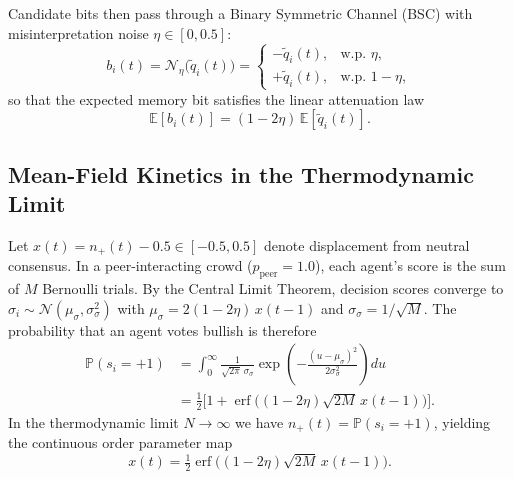 \documentclass[10pt,twocolumn,twoside,a4paper]{article}
\DeclareMathOperator{\erf}{erf}
\begin{document}
Candidate bits then pass through a Binary Symmetric Channel (BSC) with misinterpretation noise
$\eta\in[0,0.5]$:
\begin{equation}
    b_i(t) = \mathcal{N}_\eta\big(\tilde{q}_i(t)\big) =
    \begin{cases}
        -\tilde{q}_i(t), & \text{w.p. } \eta, \\[2pt]
        +\tilde{q}_i(t), & \text{w.p. } 1-\eta,
    \end{cases}
\end{equation}
so that the expected memory bit satisfies the linear attenuation law
\begin{equation}
    \mathbb{E}[b_i(t)] = (1-2\eta)\,\mathbb{E}[\tilde{q}_i(t)].
\end{equation}

\subsection{Mean-Field Kinetics in the Thermodynamic Limit}
Let $x(t)=n_+(t)-0.5\in[-0.5,0.5]$ denote displacement from neutral consensus. In a
peer-interacting crowd ($p_{\text{peer}}=1.0$), each agent's score is the sum of $M$ Bernoulli
trials. By the Central Limit Theorem, decision scores converge to
$\sigma_i\sim\mathcal{N}(\mu_\sigma,\sigma_\sigma^2)$ with
$\mu_\sigma=2(1-2\eta)\,x(t-1)$ and $\sigma_\sigma=1/\sqrt{M}$. The probability that an agent
votes bullish is therefore
\begin{align}
    \mathbb{P}(s_i=+1)
    &= \int_{0}^{\infty}\frac{1}{\sqrt{2\pi}\,\sigma_\sigma}
       \exp\!\left(-\frac{(u-\mu_\sigma)^2}{2\sigma_\sigma^{2}}\right)du \nonumber \\[2pt]
    &= \tfrac{1}{2}\Big[1+\erf\big((1-2\eta)\sqrt{2M}\,x(t-1)\big)\Big].
\end{align}
In the thermodynamic limit $N\to\infty$ we have $n_+(t)=\mathbb{P}(s_i=+1)$, yielding the
continuous order parameter map
\begin{equation}
    x(t) = \tfrac{1}{2}\erf\!\big((1-2\eta)\sqrt{2M}\,x(t-1)\big).
\end{equation}
\end{document}
